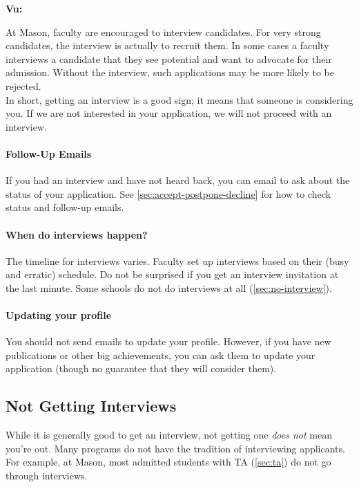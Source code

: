 \documentclass[oneside,11pt,dvipsnames]{book}
\newenvironment{commentbox}[1][]{
  \small
  \begin{mybox}
    {\small \textbf{#1}}
  }{
  \end{mybox}
}
\begin{document}
\begin{commentbox}[Vu:]
  At Mason, faculty are encouraged to interview candidates. For very strong candidates, the interview is actually to recruit them.  In some cases a faculty interviews a candidate that they see potential and want to advocate for their admission. Without the interview, such applications may be more likely to be rejected.\\
  
  In short, getting an interview is a good sign; it means that someone is considering you. If we are not interested in your application, we will not proceed with an interview.
\end{commentbox}

\paragraph{Follow-Up Emails} If you had an interview and have not heard back, you can email to ask about the status of your application. See \autoref{sec:accept-postpone-decline} for how to check status and follow-up emails.

\paragraph{When do interviews happen?}

The timeline for interviews varies.  Faculty set up interviews based on their (busy and erratic) schedule. Do not be surprised if you get an interview invitation at the last minute. Some schools do not do interviews at all (\autoref{sec:no-interview}).


\paragraph{Updating your profile} You should not send emails to update your profile.  However, if you have new publications or other big achievements, you can ask them to update your application (though no guarantee that they will consider them).

\subsection{Not Getting Interviews}\label{sec:no-interview}
While it is generally good to get an interview, not getting one \emph{does not} mean you're out.  Many programs do not have the tradition of interviewing applicants. For example, at Mason, most admitted students with TA (\autoref{sec:ta}) do not go through interviews.
\end{document}
